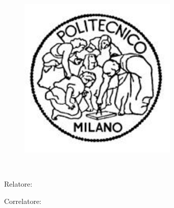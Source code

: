\begin{titlepage}
    \begin{center}
    	\large
        \spacedlowsmallcaps{\myUni} \\
        \bigskip
        \medskip\mySchool \\
    	\medskip\myDepartment \\
    	\bigskip\myCourseFirstPartIT \\
        \medskip\myCourseSecondPartIT \\  

        \hfill

        \vfill
        
        \begin{figure}[!h]
			\begin{center}
				\includegraphics[width=0.3\columnwidth]{Images/logoPoli.pdf} %
			\end{center}
		\end{figure}
		
		\vfill

        \begingroup
       		\huge	
            \color{Maroon} \myTitleIT \\ \bigskip
        \endgroup

        \vfill

		\flushleft 
		\normalsize{Relatore:}\\
		\medskip\spacedlowsmallcaps{\mySupervisor}

		\flushleft
		\normalsize{Correlatore:}\\
		\medskip\spacedlowsmallcaps{\myOtherSupervisor}\\
        

\end{center}
\end{titlepage}
